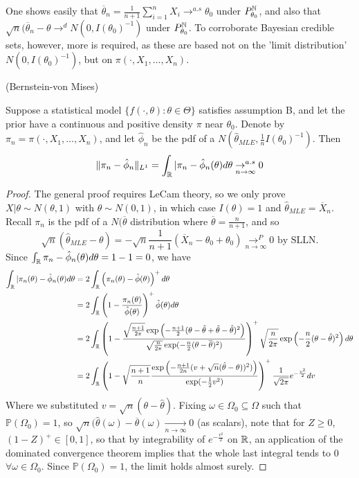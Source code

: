 \documentclass[a4paper]{article}
\begin{document}
One shows easily that $\overline{\theta}_n = \frac{1}{n+1} \sum_{i=1}^{n} X_i \to^{a.s} \theta_0 $ under $P_{\theta_0}^{\mathbb{N}}$, and also that $\sqrt{n}(\overline{\theta}_n - \theta \to ^{d} N(0, I(\theta_0)^{-1})$ under $P_{\theta_0}^{\mathbb{N}}$. To corroborate Bayesian credible sets, however, more is required, as these are based not on the 'limit distribution' $N(0, I(\theta_0)^{-1})$, but on $\pi(\cdot , X_1, \ldots, X_n)$.

\begin{thm}(Bernstein-von Mises)
	
	Suppose a statistical model $\{f\left( \cdot , \theta \right) : \theta \in \Theta \}$ satisfies assumption B, and let the prior have a continuous and positive density $\pi$ near $\theta_0$. Denote by $\pi_n = \pi(\cdot , X_1, \ldots, X_n)$, and let $\hat{\phi}_n$ be the pdf of a $N(\hat{\theta}_{MLE}, \frac{1}{n}I(\theta_0)^{-1})$. Then
	\[
		\|\pi_n - \hat{\phi}_n\|_{L^{1}} = \int_{\mathbb{R}} |\pi_n - \hat{\phi}_n(\theta)d\theta \underset{n\to \infty}{\to ^{a.s}} 0
	\] 
\end{thm}

\begin{proof}
	The general proof requires LeCam theory, so we only prove $X|\theta \sim N(\theta, 1)$ with  $\theta \sim N(0,1)$, in which case $I(\theta) = 1$ and $\hat{\theta}_{MLE} = \overline{X}_{n}$. Recall $\pi_n$ is the pdf of a $N(\overline{\theta}$ distribution where $ \overline{\theta} = \frac{n}{n+1}$, and so
	\[
		\sqrt{n} (\hat{\theta}_{MLE} - \theta) = - \sqrt{n} \frac{1}{n+1} (\overline{X}_n - \theta_0 + \theta_0) \underset{n\to \infty}{\to ^{P}} 0 \text{ by SLLN.}
	\] 
	Since $\int_{\mathbb{R}} \pi_n - \hat{\phi}_n(\theta) d\theta = 1-1 = 0$, we have 
	\begin{align*}
		\int_{\mathbb{R}} |\pi_n (\theta) - \hat{\phi}_n(\theta) d\theta &= 2\int_{\mathbb{R}} \left( \pi_n(\theta) - \hat{\phi}(\theta) \right)^{+} d\theta  \\
		&= 2\int_{\mathbb{R}} \left( 1 - \frac{\pi_n(\theta)}{\hat{\phi}(\theta)} \right) ^{+} \hat{\phi}(\theta) d\theta \\
		&= 2\int_{\mathbb{R}} \left( 1 - \frac{\sqrt{\frac{n+1}{2\pi}} \exp\left(-\frac{n+1}{2}(\theta - \hat{\theta} + \hat{\theta} - \hat{\theta})^2\right) }{\sqrt{\frac{n}{2\pi}} \exp(-\frac{n}{2}(\theta - \overline{\theta})^2) } \right)^{+} \sqrt{\frac{n}{2\pi}} \exp\left( -\frac{n}{2}(\theta - \hat{\theta})^2 \right) d\theta  \\
		&= 2\int_{\mathbb{R}} \left( 1 - \sqrt{\frac{n+1}{n}} \frac{\exp\left( - \frac{n+1}{2n} (v + \sqrt{n} (\hat{\theta} - \theta))^2) \right) }{\exp(-\frac{1}{2}v^2) } \right)^{+} \frac{1}{\sqrt{2\pi} } e^{-\frac{v^2}{2}} dv
	\end{align*}
	Where we substituted $v = \sqrt{n} (\theta - \hat{\theta})$. Fixing  $\omega \in \Omega_0 \subseteq \Omega$ such that $\mathbb{P}\left( \Omega_0 \right) = 1$, so $\sqrt{n} (\hat{\theta}(\omega) - \overline{\theta}(\omega) \underset{n\to \infty}{\to } 0 $ (as scalars), note that for $Z\ge 0$, $(1-Z)^{+} \in [0,1]$, so that by integrability of $e^{-\frac{v^2}{2}}$ on $\mathbb{R}$, an application of the dominated convergence theorem implies that the whole last integral tends to $0$ $\forall \omega \in \Omega_0$. Since $\mathbb{P}\left( \Omega_0 \right) = 1$, the limit holds almost surely.
\end{proof}
\end{document}
